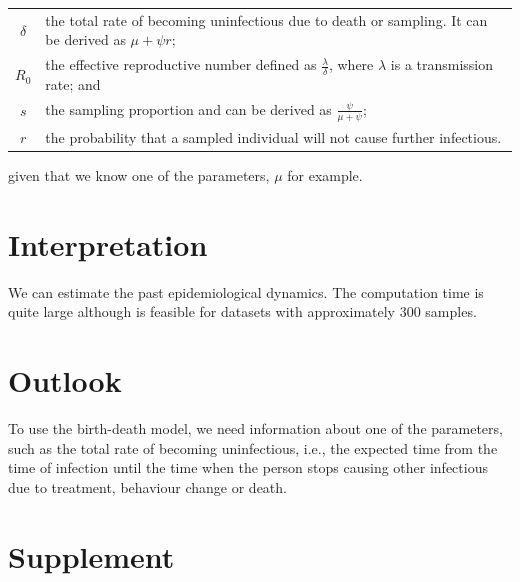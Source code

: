 \documentclass[12pt]{article}
\begin{document}
\begin{tabular} {cp{}}
$\delta$ & the total rate of becoming uninfectious due to death or sampling. It can be derived as  $\mu + \psi r$; \\

$R_0$ & the effective reproductive number defined as $\frac \lambda \delta$, where $\lambda$ is a transmission rate; and \\

$s$ & the sampling proportion and can be derived as $\frac \psi {\mu + \psi}$; \\

$r$ & the probability that a sampled individual will not cause further infectious. 
\end{tabular}

\vskip2mm

\noindent given that we know one of the parameters, $\mu$ for example.  

\section{Interpretation}

We can estimate the past epidemiological dynamics. The computation time is quite large although is feasible for datasets with approximately 300 samples. 



\section{Outlook}

To use the birth-death model, we need information about one of the parameters, such as the total rate of becoming uninfectious, i.e., the expected time from the time of infection until the time when the person stops causing other infectious due to treatment, behaviour change or death. 

\section{Supplement}
\end{document}
